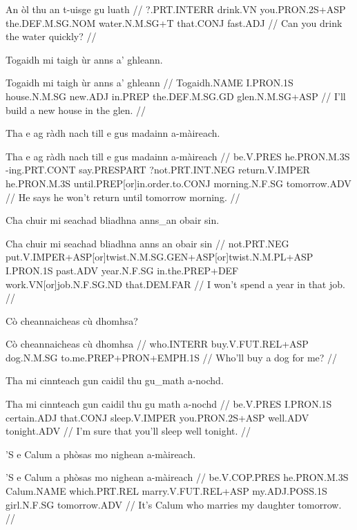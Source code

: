 \documentclass[a4paper,10pt]{article}
\begin{document}
\vspace{4mm}
\gla An òl thu an t-uisge gu luath  //
\glb ?.PRT.INTERR drink.VN you.PRON.2S+ASP the.DEF.M.SG.NOM water.N.M.SG+T that.CONJ fast.ADJ  //
\glft Can you drink the water quickly? //
\endgl
\xe

\ex
\begingl
\glpre Togaidh mi taigh ùr anns a' ghleann. 

\vspace{4mm}
\gla Togaidh mi taigh ùr anns a' ghleann  //
\glb Togaidh.NAME I.PRON.1S house.N.M.SG new.ADJ in.PREP the.DEF.M.SG.GD glen.N.M.SG+ASP  //
\glft I'll build a new house in the glen. //
\endgl
\xe

\ex
\begingl
\glpre Tha e ag ràdh nach till e gus madainn a-màireach. 

\vspace{4mm}
\gla Tha e ag ràdh nach till e gus madainn a-màireach  //
\glb be.V.PRES he.PRON.M.3S -ing.PRT.CONT say.PRESPART ?not.PRT.INT.NEG return.V.IMPER he.PRON.M.3S until.PREP[or]in.order.to.CONJ morning.N.F.SG tomorrow.ADV  //
\glft He says he won't return until tomorrow morning. //
\endgl
\xe

\ex
\begingl
\glpre Cha chuir mi seachad bliadhna anns\_an obair sin. 

\vspace{4mm}
\gla Cha chuir mi seachad bliadhna {anns an} obair sin  //
\glb not.PRT.NEG put.V.IMPER+ASP[or]twist.N.M.SG.GEN+ASP[or]twist.N.M.PL+ASP I.PRON.1S past.ADV year.N.F.SG in.the.PREP+DEF work.VN[or]job.N.F.SG.ND that.DEM.FAR  //
\glft I won't spend a year in that job. //
\endgl
\xe

\ex
\begingl
\glpre Cò cheannaicheas cù dhomhsa? 

\vspace{4mm}
\gla Cò cheannaicheas cù dhomhsa  //
\glb who.INTERR buy.V.FUT.REL+ASP dog.N.M.SG to.me.PREP+PRON+EMPH.1S  //
\glft Who'll buy a dog for me? //
\endgl
\xe

\ex
\begingl
\glpre Tha mi cinnteach gun caidil thu gu\_math a-nochd. 

\vspace{4mm}
\gla Tha mi cinnteach gun caidil thu {gu math} a-nochd  //
\glb be.V.PRES I.PRON.1S certain.ADJ that.CONJ sleep.V.IMPER you.PRON.2S+ASP well.ADV tonight.ADV  //
\glft I'm sure that you'll sleep well tonight. //
\endgl
\xe

\ex
\begingl
\glpre 'S e Calum a phòsas mo nighean a-màireach. 

\vspace{4mm}
\gla 'S e Calum a phòsas mo nighean a-màireach  //
\glb be.V.COP.PRES he.PRON.M.3S Calum.NAME which.PRT.REL marry.V.FUT.REL+ASP my.ADJ.POSS.1S girl.N.F.SG tomorrow.ADV  //
\glft It's Calum who marries my daughter tomorrow. //
\endgl
\xe
\end{document}
